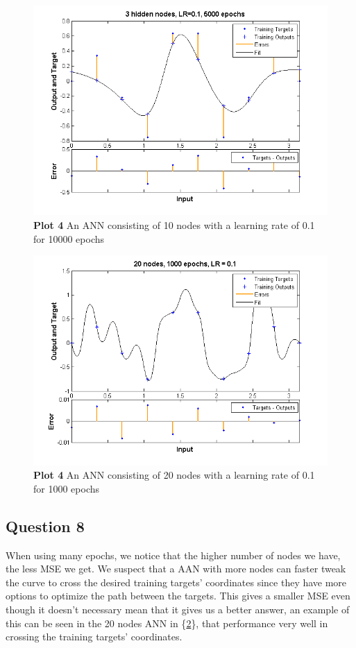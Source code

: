 \documentclass[a4paper]{article}
\begin{document}
\begin{figure}[h!] %
	\includegraphics[scale=0.8]{plot4_3nodes.png}
	\caption{\label{fig:plot4_10nodes.png}\textbf{Plot 4} An ANN consisting of 10 nodes with a learning rate of 0.1 for 10000 epochs}
\end{figure}
\begin{figure}[h!] %
	\includegraphics[scale=0.8]{plot4_20nodes.png}
	\caption{\label{fig:plot4_20nodes.png}\textbf{Plot 4} An ANN consisting of 20 nodes with a learning rate of 0.1 for 1000 epochs}
\end{figure}

\subsection*{Question 8}
When using many epochs, we notice that the higher number of nodes we have, the less MSE we get. We suspect that a AAN with more nodes can faster tweak the curve to cross the desired training targets' coordinates since they have more options to optimize the path between the targets. This gives a smaller MSE even though it doesn't necessary mean that it gives us a better answer, an example of this can be seen in the 20 nodes ANN in \{\ref{fig:plot4_20nodes.png}\}, that performance very well in crossing the training targets' coordinates.
\end{document}
